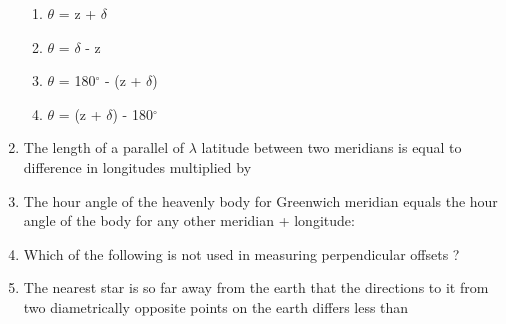 \documentclass[11pt,a4paper]{article}
\begin{document}
\begin{enumerate}
\begin{enumerate}[label=\Alph*.]
\item{$\theta$ = z + $\delta$}
\item{$\theta$ = $\delta$ - z}
\item{$\theta$ = 180$^\circ$ - (z + $\delta$)}
\item{$\theta$ = (z + $\delta$) - 180$^\circ$}
\end{enumerate}
\item{The length of a parallel of $\lambda$ latitude between two meridians is equal to difference in longitudes multiplied by
}
\\
\item{The hour angle of the heavenly body for Greenwich meridian equals the hour angle of the body for any other meridian + longitude:}
\\
\item{Which of the following is not used in measuring perpendicular offsets ?}
\\
\item{The nearest star is so far away from the earth that the directions to it from two diametrically opposite points on the earth differs less than}
\\
\end{enumerate}
\end{document}
